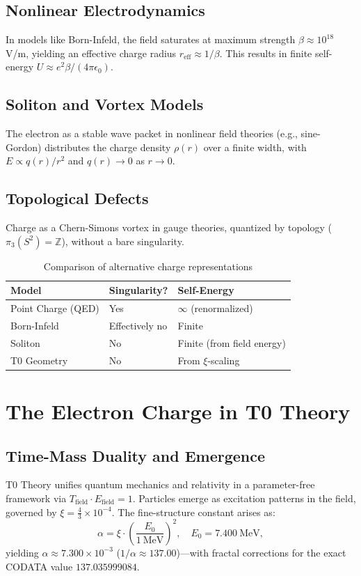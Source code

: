 	\subsection{Nonlinear Electrodynamics}
	In models like Born-Infeld, the field saturates at maximum strength $\beta \approx 10^{18}$ V/m, yielding an effective charge radius $r_{\text{eff}} \approx 1/\beta$. This results in finite self-energy $U \approx e^2 \beta / (4\pi \epsilon_0)$.
	
	\subsection{Soliton and Vortex Models}
	The electron as a stable wave packet in nonlinear field theories (e.g., sine-Gordon) distributes the charge density $\rho(r)$ over a finite width, with $E \propto q(r)/r^2$ and $q(r) \to 0$ as $r \to 0$.
	
	\subsection{Topological Defects}
	Charge as a Chern-Simons vortex in gauge theories, quantized by topology ($\pi_3(S^2) = \mathbb{Z}$), without a bare singularity.
	
	\begin{table}[h]
		\centering
		\begin{tabular}{lll}
			\toprule
			\textbf{Model} & \textbf{Singularity?} & \textbf{Self-Energy} \\
			\midrule
			Point Charge (QED) & Yes & $\infty$ (renormalized) \\
			Born-Infeld & Effectively no & Finite \\
			Soliton & No & Finite (from field energy) \\
			T0 Geometry & No & From $\xi$-scaling \\
			\bottomrule
		\end{tabular}
		\caption{Comparison of alternative charge representations}
		\label{tab:comparison}
	\end{table}
	
	\section{The Electron Charge in T0 Theory}
	\label{sec:t0-charge}
	
	\subsection{Time-Mass Duality and Emergence}
	T0 Theory unifies quantum mechanics and relativity in a parameter-free framework via $T_{\text{field}} \cdot E_{\text{field}} = 1$. Particles emerge as excitation patterns in the field, governed by $\xi = \frac{4}{3} \times 10^{-4}$. The fine-structure constant arises as:
	\begin{equation}
		\alpha = \xi \cdot \left( \frac{E_0}{1~\mathrm{MeV}} \right)^2, \quad E_0 = 7.400~\mathrm{MeV},
	\end{equation}
	yielding $\alpha \approx 7.300 \times 10^{-3}$ ($1/\alpha \approx 137.00$)—with fractal corrections for the exact CODATA value $137.035999084$.
	
